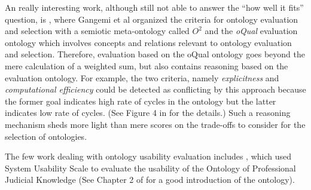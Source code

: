 An really interesting work, although still not able to answer the ``how well it fits'' question, is \cite{gangemi2006qood}, where Gangemi et al organized the criteria for ontology evaluation and selection with a semiotic meta-ontology called $O^2$ and the \emph{oQual} evaluation ontology which involves concepts and relations relevant to ontology evaluation and selection. Therefore, evaluation based on the oQual ontology goes beyond the mere calculation of a weighted sum, but also contains reasoning based on the evaluation ontology. For example, the two criteria, namely \emph{explicitness} and \emph{computational efficiency} could be detected as conflicting by this approach because the former goal indicates high rate of cycles in the ontology but the latter indicates low rate of cycles. (See Figure 4 in \cite{gangemi2006qood} for the details.) Such a reasoning mechanism sheds more light than mere scores on the trade-offs to consider for the selection of ontologies.

The few work dealing with ontology usability evaluation includes \cite{casellas2009ontology}, which used System Usability Scale \cite{brooke1996sus} to evaluate the usability of the Ontology of Professional Judicial Knowledge (See Chapter 2 of \cite{casellas2009ontology} for a good introduction of the ontology).


